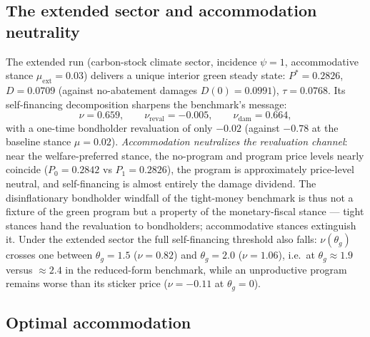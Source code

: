 \documentclass[12pt]{article}
\begin{document}
\subsection{The extended sector and accommodation neutrality}\label{subsec:extended}

The extended run (carbon-stock climate sector, incidence $\psi=1$,
accommodative stance $\mu_{\mathrm{ext}}=0.03$) delivers a unique interior
green steady state: $P^{*}=0.2826$, $D=0.0709$ (against no-abatement damages
$D(0)=0.0991$), $\tau=0.0768$. Its self-financing decomposition sharpens the
benchmark's message:
\[
\nu = 0.659, \qquad \nu_{\mathrm{reval}} = -0.005, \qquad
\nu_{\mathrm{dam}} = 0.664,
\]
with a one-time bondholder revaluation of only $-0.02$ (against $-0.78$ at
the baseline stance $\mu=0.02$). \emph{Accommodation neutralizes the
revaluation channel}: near the welfare-preferred stance, the no-program and
program price levels nearly coincide ($P_0=0.2842$ vs $P_1=0.2826$), the
program is approximately price-level neutral, and self-financing is almost
entirely the damage dividend. The disinflationary bondholder windfall of the
tight-money benchmark is thus not a fixture of the green program but a property
of the monetary-fiscal stance --- tight stances hand the revaluation to
bondholders; accommodative stances extinguish it. Under the extended sector
the full self-financing threshold also falls: $\nu(\theta_g)$ crosses one
between $\theta_g=1.5$ ($\nu=0.82$) and $\theta_g=2.0$ ($\nu=1.06$), i.e.\
at $\theta_g\approx1.9$ versus $\approx2.4$ in the reduced-form benchmark,
while an unproductive program remains worse than its sticker price
($\nu=-0.11$ at $\theta_g=0$).

\subsection{Optimal accommodation}\label{subsec:optmu}
\end{document}
